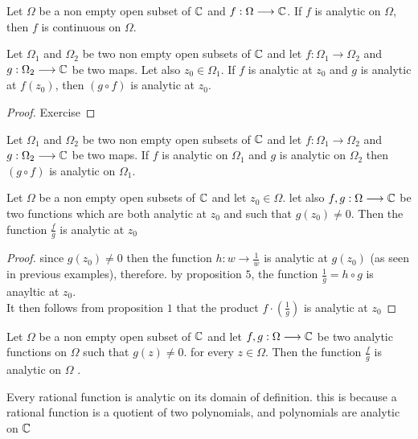  \begin{corollary}[Immediate]
    Let $\Omega  $ be a non empty open subset of $\mathbb{C}  $ and $ f : \Omega  \longrightarrow \mathbb{C}  $. If 
    $f $ is analytic on $\Omega  $, then $f $ is continuous on $\Omega$. 
  \end{corollary}
  \begin{proposition}
    Let $\Omega_{1} $ and $\Omega _{2} $ be two 
    non empty open subsets of $\mathbb{C}  $ and 
    let
    $ f : \Omega _{1} \longrightarrow \Omega _{2} $ and 
    $ g : \Omega _{2} \longrightarrow \mathbb{C}  $ 
    be two maps. Let also $z_0 \in  \Omega _{1} $. If $f $ is analytic
    at $z_0 $ and $g $ is analytic at $f(z_0)  $, then $(g \circ f)  $ 
    is analytic at $z_0$. 
  \end{proposition}
  \begin{proof}
  Exercise 
  \end{proof}
  \begin{corollary}[Immediate]
    Let $\Omega_{1} $ and $\Omega _{2} $ be two 
    non empty open subsets of $\mathbb{C}  $ and let $ f : \Omega _{1} \longrightarrow  \Omega _{2}$ 
    and $ g : \Omega _{2} \longrightarrow \mathbb{C}  $ be two maps. If $f $ is analytic
    on $\Omega _{1} $ and $g $ is analytic on $\Omega _{2} $ then $(g \circ f)  $ is analytic
    on $\Omega _{1} $. 
  \end{corollary}
  \begin{proposition}
    Let $\Omega  $ be a non empty open subsets of $\mathbb{C}  $ and let $z_0 \in  \Omega  $. let 
    also $ f,g : \Omega  \longrightarrow \mathbb{C}  $ be two functions which are both analytic at $z_0 $ 
    and such that $ g(z_0) \neq 0 $. Then the function $\frac{f}{g} $ is analytic at $z_0 $ 
  \end{proposition}
  \begin{proof}
  since $g(z_0) \neq 0 $ then the function $ h : w \longrightarrow \frac{1}{w} $ is analytic at $g(z_0)  $
  (as seen in previous examples), therefore. by proposition $5 $, the function $\frac{1}{g} = h \circ g $ is 
  anayltic at $z_0 $. \\
  It then follows from proposition $1 $ that the product $f \cdot \left( \frac{1}{g} \right)  $ is analytic
  at $z_0 $ 
  \end{proof}
  \begin{corollary}[Immediate]
    Let $\Omega  $ be a non empty open subset of $\mathbb{C}  $ and let $ f,g : \Omega  \longrightarrow \mathbb{C}  $ be
    two analytic functions on $\Omega  $ such that $g(z) \neq 0 $. for every $z \in   \Omega $. Then the
    function $\frac{f}{g} $ is analytic on $\Omega  $ .
  \end{corollary}
  \begin{example}
    Every rational function is analytic on its domain of definition. this is because a rational
    function is a quotient of two polynomials, and polynomials are analytic on $\mathbb{C}  $ 
  \end{example}
  \divider
